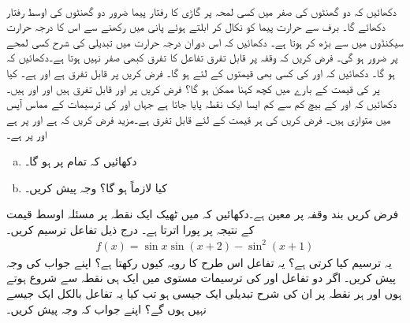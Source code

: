 \\
دکھائیں کہ دو گھنٹوں کی صفر میں کسی لمحہ پر گاڑی کا رفتار پیما ضرور دو گھنٹوں کی اوسط رفتار دکھائے گا۔
\quad
برف سے حرارت پیما کو نکال کر ابلتے  ہوئے پانی میں رکھنے سے اس کا درجہ حرارت  سیکنڈوں میں  سے بڑھ کر  ہوتا ہے۔ دکھائیں کہ اس دوران درجہ حرارت میں تبدیلی کی شرح کسی لمحے پر  ضرور ہو گی۔ 
فرض کریں کہ وقفہ  پر قابل تفرق تفاعل  کا تفرق کبھی صفر نہیں ہوتا ہے۔دکھائیں کہ  ہو گا۔ 
دکھائیں کہ  اور  کی کسی بھی قیمتوں کے لئے  ہو گا۔
فرض کریں  پر  قابل تفرق ہے اور  ہے۔ کیا  پر  کی قیمت کے بارے میں کچھ کہنا ممکن ہو گا؟
فرض کریں  پر  اور  قابل تفرق ہیں اور  اور  ہیں۔دکھائیں کہ  اور  کے بیچ کم سے کم ایسا ایک نقطہ پایا جاتا ہے جہاں  اور  کی ترسیمات کے مماس آپس میں متوازی ہیں۔
فرض کریں  کی ہر قیمت کے لئے  قابل تفرق ہے۔مزید فرض کریں کہ  ہے اور   پر   ہے اور  پر  ہے۔
\begin{enumerate}[a.]
\item
دکھائیں کہ تمام  پر  ہو گا۔
\item
کیا  لازماً ہو گا؟ وجہ پیش کریں۔

\end{enumerate}
فرض کریں  بند وقفہ  پر معین ہے۔دکھائیں کہ  میں ٹھیک ایک نقطہ  پر  مسئلہ اوسط قیمت  کے نتیجہ پر پورا اترتا ہے۔ 
\quad
درج ذیل تفاعل ترسیم کریں۔
\begin{align*}
f(x)=\sin x\sin(x+2)-\sin^2(x+1)
\end{align*}
یہ ترسیم کیا کرتی ہے؟ یہ تفاعل اس طرح کا رویہ کیوں رکھتا ہے؟ اپنے جواب کی وجہ پیش کریں۔
اگر دو تفاعل  اور  کی ترسیمات مستوی میں ایک ہی نقطہ سے شروع ہوتے ہوں اور ہر نقطہ پر ان کی شرح تبدیلی ایک جیسی ہو تب کیا یہ تفاعل بالکل ایک جیسے نہیں ہوں گے؟ اپنے جواب کہ وجہ پیش کریں۔ 
